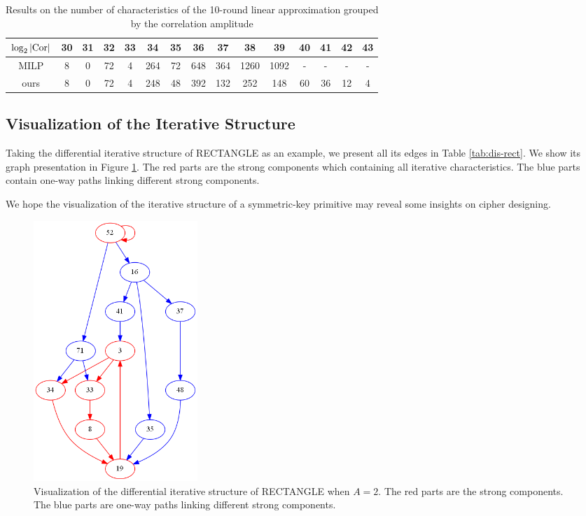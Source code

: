 \begin{table}
	\caption{Results on the number of characteristics of the 10-round linear approximation grouped by the correlation amplitude}\label{tab:num-linear}
	\centering
	\begin{tabular}{|c|c|c|c|c|c|c|c|c|c|c|c|c|c|c|}
		\hline
		$\log_2|\text{Cor}|$ & 30 & 31 & 32 & 33 & 34 & 35 & 36 & 37 & 38 & 39 & 40 & 41 & 42 & 43\\
		\hline
		MILP & 8 & 0 & 72 & 4 & 264 & 72 & 648 & 364 & 1260 & 1092 & - & - & - & -\\
		\hline
		ours & 8 & 0 & 72 & 4 & 248 & 48 & 392 & 132 & 252 & 148 & 60 & 36 & 12 & 4\\
		\hline
	\end{tabular}
\end{table}

\subsection{Visualization of the Iterative Structure}

Taking the differential iterative structure of RECTANGLE as an example, we present all its edges in Table \ref{tab:dis-rect}. We show its graph presentation in Figure \ref{fig:dis-rect}. The red parts are the strong components which containing all iterative characteristics. The blue parts contain one-way paths linking different strong components. 

We hope the visualization of the iterative structure of a symmetric-key primitive may reveal some insights on cipher designing. 

\begin{figure}\label{fig:dis-rect}
    \centering
    \caption{Visualization of the differential iterative structure of RECTANGLE when $A=2$. The red parts are the strong components. The blue parts are one-way paths linking different strong components. }
	\includegraphics[width=0.3\textwidth]{fig/test_circuits.png}
\end{figure}


